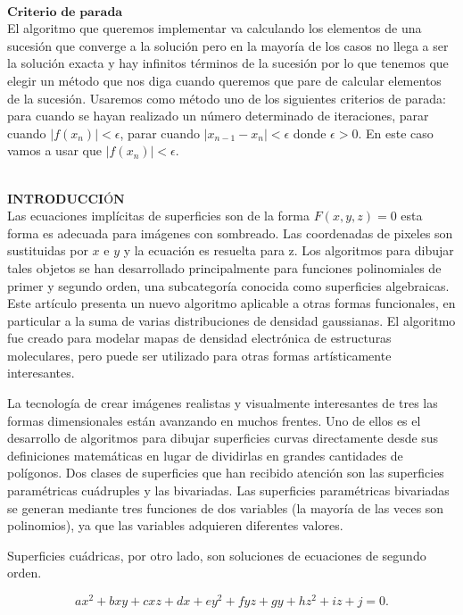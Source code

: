 ${ }$\\
$\textbf{Criterio de parada}$
${ }$\\

El algoritmo que queremos implementar va calculando los elementos de una sucesión que converge a la solución pero en la mayoría de los casos no llega a ser la solución exacta y hay infinitos términos de la sucesión por lo que tenemos que elegir un método que nos diga cuando queremos que pare de calcular elementos de la sucesión. Usaremos como método uno de los siguientes criterios de parada: para cuando se hayan realizado un número determinado de iteraciones, parar cuando $|f(x_n)| < \epsilon$, parar cuando $|x_{n-1} -x_n| < \epsilon$ donde $\epsilon > 0$. En este caso vamos a usar que $|f(x_n)| < \epsilon$.


${ }$\\
$\textbf{INTRODUCCIÓN}$
${ }$\\

Las ecuaciones implícitas de superficies son de la forma $F(x, y, z) = 0$ esta forma es adecuada para imágenes con sombreado. Las coordenadas de pixeles son sustituidas por $x$ e $y$ y la ecuación es resuelta para z. Los algoritmos para dibujar tales objetos se han desarrollado principalmente para funciones polinomiales de primer y segundo orden, una subcategoría conocida como superficies algebraicas. Este artículo presenta un nuevo algoritmo aplicable a otras formas funcionales, en particular a la suma de varias distribuciones de densidad gaussianas. El algoritmo fue creado para modelar mapas de densidad electrónica de estructuras moleculares, pero puede ser utilizado para otras formas artísticamente interesantes.

La tecnología de crear imágenes realistas y visualmente interesantes de tres
las formas dimensionales están avanzando en muchos frentes. Uno de ellos es el desarrollo de algoritmos para dibujar superficies curvas directamente desde sus definiciones matemáticas en lugar de dividirlas en grandes cantidades de polígonos. Dos clases de superficies que han recibido atención son las superficies paramétricas cuádruples y las bivariadas. Las superficies paramétricas bivariadas se generan mediante tres funciones de dos variables (la mayoría de las veces son polinomios), ya que las variables adquieren diferentes valores.

Superficies cuádricas, por otro lado, son soluciones de ecuaciones de segundo orden.

\[
	ax^2 + bxy + cxz +dx +ey^2 +fyz +gy + hz^2 + iz +j = 0.
\]

